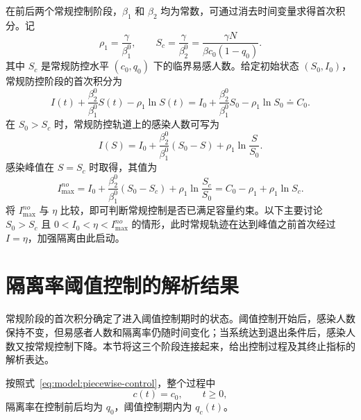\documentclass[UTF8,a4paper,10pt,fontset=fandol]{ctexart}
\theoremstyle{cnplain}
\theoremstyle{remark}
\numberwithin{equation}{section}
\begin{document}
在前后两个常规控制阶段，$\beta_1$ 和 $\beta_2$ 均为常数，可通过消去时间变量求得首次积分。记
\begin{equation}
\rho_1=\frac{\gamma}{\beta_1^0},
\qquad
S_c=\frac{\gamma}{\beta_2^0}
=\frac{\gamma N}{\beta c_0(1-q_0)}.
\label{eq:model:baseline-symbols}
\end{equation}
其中 $S_c$ 是常规防控水平 $(c_0,q_0)$ 下的临界易感人数。给定初始状态 $(S_0,I_0)$，常规防控阶段的首次积分为
\begin{equation}
I(t)+\frac{\beta_2^0}{\beta_1^0} S(t)-\rho_1\ln S(t)
=
I_0+\frac{\beta_2^0}{\beta_1^0} S_0-\rho_1\ln S_0
\doteq C_0.
\label{eq:model:first-integral}
\end{equation}
在 $S_0>S_c$ 时，常规防控轨道上的感染人数可写为
\begin{equation*}
I(S)=I_0+\frac{\beta_2^0}{\beta_1^0}(S_0-S)
+\rho_1\ln\frac{S}{S_0}.
\end{equation*}
感染峰值在 $S=S_c$ 时取得，其值为
\begin{equation}
I_{\max}^{no}
=
I_0+\frac{\beta_2^0}{\beta_1^0}(S_0-S_c)
+\rho_1\ln\frac{S_c}{S_0}=C_0-\rho_1+\rho_1\ln S_c.
\label{eq:s1:Imax-no}
\end{equation}
将 $I_{\max}^{no}$ 与 $\eta$ 比较，即可判断常规控制是否已满足容量约束。以下主要讨论 $S_0>S_c$ 且 $0<I_0<\eta<I_{\max}^{no}$ 的情形，此时常规轨迹在达到峰值之前首次经过 $I=\eta$，加强隔离由此启动。

\section{隔离率阈值控制的解析结果}
\label{sec:s1}
常规阶段的首次积分确定了进入阈值控制期时的状态。阈值控制开始后，感染人数保持不变，但易感者人数和隔离率仍随时间变化；当系统达到退出条件后，感染人数又按常规控制下降。本节将这三个阶段连接起来，给出控制过程及其终止指标的解析表达。

按照式~\eqref{eq:model:piecewise-control}，整个过程中
\begin{equation*}
c(t)=c_0,\qquad t\ge 0,
\end{equation*}
隔离率在控制前后均为 $q_0$，阈值控制期内为 $q_c(t)$。
\end{document}
